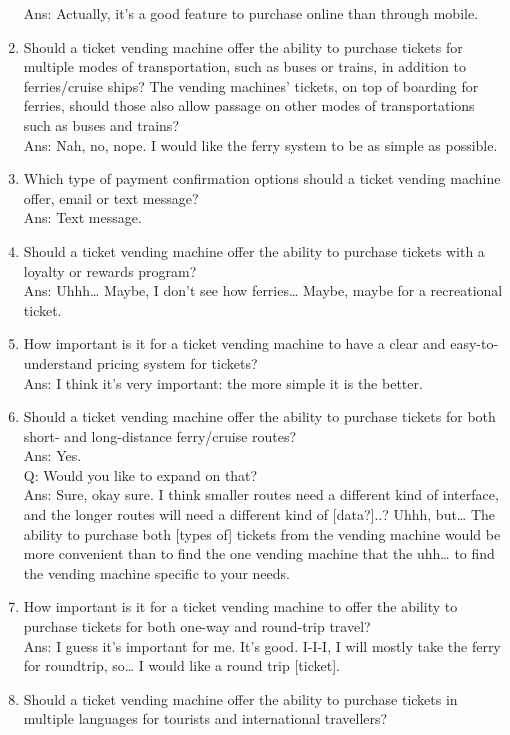 \begin{enumerate}
Ans: Actually, it’s a good feature to purchase online than through mobile.
    \item Should a ticket vending machine offer the ability to purchase tickets for multiple modes of transportation, such as buses or trains, in addition to ferries/cruise ships? The vending machines’ tickets, on top of boarding for ferries, should those also allow passage on other modes of transportations such as buses and trains?\\
Ans: Nah, no, nope. I would like the ferry system to be as simple as possible.
    \item Which type of payment confirmation options should a ticket vending machine offer, email or text message?\\
Ans: Text message.
    \item Should a ticket vending machine offer the ability to purchase tickets with a loyalty or rewards program?\\
Ans: Uhhh… Maybe, I don’t see how ferries… Maybe, maybe for a recreational ticket.
    \item How important is it for a ticket vending machine to have a clear and easy-to-understand pricing system for tickets?\\
Ans: I think it’s very important: the more simple it is the better.
    \item Should a ticket vending machine offer the ability to purchase tickets for both short- and long-distance ferry/cruise routes?\\
Ans: Yes.\\
Q: Would you like to expand on that?\\
Ans: Sure, okay sure. I think smaller routes need a different kind of interface, and the longer routes will need a different kind of [data?]..? Uhhh, but… The ability to purchase both [types of] tickets from the vending machine would be more convenient than to find the one vending machine that the uhh… to find the vending machine specific to your needs.
    \item How important is it for a ticket vending machine to offer the ability to purchase tickets for both one-way and round-trip travel?\\
Ans: I guess it’s important for me. It’s good. I-I-I, I will mostly take the ferry for roundtrip, so… I would like a round trip [ticket].
    \item Should a ticket vending machine offer the ability to purchase tickets in multiple languages for tourists and international travellers?\\

\end{enumerate}

